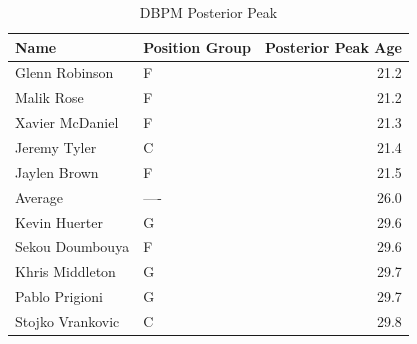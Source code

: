 \begin{table}[t]
\caption*{
{\large DBPM Posterior Peak}
} 
\fontsize{12.0pt}{14.4pt}\selectfont
\begin{tabular*}{\linewidth}{@{\extracolsep{\fill}}llr}
\toprule
Name & Position Group & Posterior Peak Age \\ 
\midrule\addlinespace[2.5pt]
Glenn Robinson & F & 21.2 \\ 
Malik Rose & F & 21.2 \\ 
Xavier McDaniel & F & 21.3 \\ 
Jeremy Tyler & C & 21.4 \\ 
Jaylen Brown & F & 21.5 \\ 
Average & ---- & 26.0 \\ 
Kevin Huerter & G & 29.6 \\ 
Sekou Doumbouya & F & 29.6 \\ 
Khris Middleton & G & 29.7 \\ 
Pablo Prigioni & G & 29.7 \\ 
Stojko Vrankovic & C & 29.8 \\ 
\bottomrule
\end{tabular*}
\end{table}

